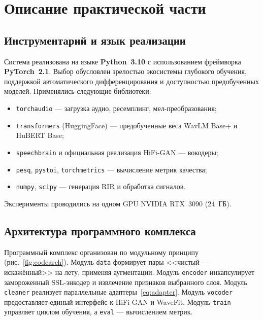\section{Описание практической части}
\label{sec:Chapter4} 

\subsection{Инструментарий и язык реализации}

Система реализована на языке \textbf{Python~3.10} с использованием фреймворка
\textbf{PyTorch~2.1}. Выбор обусловлен зрелостью экосистемы глубокого обучения,
поддержкой автоматического дифференцирования и доступностью предобученных
моделей. Применялись следующие библиотеки:
\begin{itemize}
    \item \texttt{torchaudio} --- загрузка аудио, ресемплинг, мел-преобразования;
    \item \texttt{transformers} (HuggingFace) --- предобученные веса WavLM Base+
        и HuBERT Base;
    \item \texttt{speechbrain} и официальная реализация HiFi-GAN --- вокодеры;
    \item \texttt{pesq}, \texttt{pystoi}, \texttt{torchmetrics} ---
        вычисление метрик качества;
    \item \texttt{numpy}, \texttt{scipy} --- генерация RIR и обработка сигналов.
\end{itemize}
Эксперименты проводились на одном GPU NVIDIA RTX~3090 (24~ГБ).

\subsection{Архитектура программного комплекса}

Программный комплекс организован по модульному принципу
(рис.~\ref{fig:codearch}). Модуль \texttt{data} формирует пары
<<чистый — искажённый>> на лету, применяя аугментации. Модуль \texttt{encoder}
инкапсулирует замороженный SSL-энкодер и извлечение признаков выбранного слоя.
Модуль \texttt{cleaner} реализует параллельные адаптеры~\eqref{eq:adapter}.
Модуль \texttt{vocoder} предоставляет единый интерфейс к HiFi-GAN и WaveFit.
Модуль \texttt{train} управляет циклом обучения, а \texttt{eval} ---
вычислением метрик.

